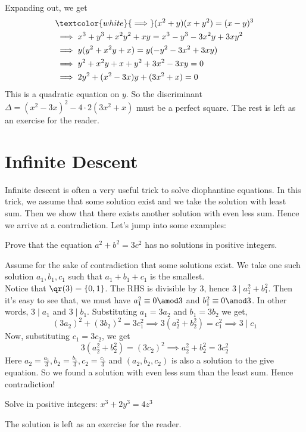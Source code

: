 \documentclass[11pt]{scrartcl}
\begin{document}
\begin{soln}
Expanding out, we get
\begin{equation*}
\begin{split}
&\textcolor{white}{\implies} (x^2+y)(x+y^2)=(x-y)^3 \\
&\implies x^3 + y^3 + x^2 y^2 + xy = x^3 - y^3 - 3 x^2 y + 3xy^2 \\
&\implies y(y^2 + x^2 y + x ) = y(-y^2 -3x^2 + 3xy)\\
&\implies y^2 + x^2 y + x +y^2 +3x^2 - 3xy = 0\\
&\implies 2y^2 + (x^2 -3x) y + (3x^2 +x) = 0
\end{split}
\end{equation*}
This is a quadratic equation on \(y\). So the discriminant \(\Delta = (x^2 -3x)^2 - 4\cdot 2 (3x^2 +x)\) must be a perfect square. The rest is left as an exercise for the reader.
\end{soln}

\section{Infinite Descent}
Infinite descent is often a very useful trick to solve diophantine equations. In this trick, we assume that some solution exist and we take the solution with least sum. Then we show that there exists another solution with even less sum. Hence we arrive at a contradiction. Let's jump into some examples:
\begin{exercise}
Prove that the equation \(a^2+b^2= 3c^2\) has no solutions in positive integers.
\end{exercise}
\begin{soln}
Assume for the sake of contradiction that some solutions exist. We take one such solution \(a_1, b_1, c_1\) such that \(a_1 + b_1 + c_1\) is the smallest. \\
Notice that \(\qr(3) = \left\{ 0,1 \right\} \). The RHS is divisible by \(3\), hence \(3 \mid a_1^2 + b_1^2\). Then it's easy to see that, we must have \(a_1^2 \equiv 0 \amod 3\) and \(b_1^2 \equiv 0 \amod 3\). In other words, \(3 \mid a_1\) and \(3\mid b_1\). Substituting \(a_1 = 3a_2\) and \(b_1 = 3b_2\) we get,
\[
	(3a_2)^2 + (3b_2)^2 = 3c_1^2 \implies 3 (a_2^2+b_2^2) = c_1^2 \implies 3 \mid c_1
\]
Now, substituting \(c_1 = 3c_2\), we get
\[
	3 (a_2^2+b_2^2) = (3c_2)^2 \implies a_2^2+b_2^2 = 3c_2^2
\]
Here \(a_2 = \frac{a_1}{3}, b_2 = \frac{b_1}{3}, c_2 = \frac{c_1}{3}\) and \((a_2, b_2, c_2)\) is also a solution to the give equation. So we found a solution with even less sum than the least sum. Hence contradiction!
\end{soln}
\begin{exercise}
Solve in positive integers: \(x^3 + 2y^3 = 4z^3\)
\end{exercise}
The solution is left as an exercise for the reader.
\end{document}
